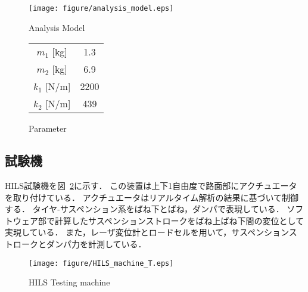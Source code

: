 \documentclass{article_vdlab_sotsuron_youshi}
\begin{document}
\begin{figure}[H]
  \begin{minipage}{0.5\hsize}
    \begin{center}
      \texttt{[image: figure/analysis\_model.eps]}
      \vspace*{1mm}
      \caption{Analysis Model}
    \label{fig:Analysis Model}
    \end{center}
  \end{minipage}
  \begin{minipage}{0.35\hsize}
      \begin{center}
	\makeatletter
	\def\@captype{table}
	\makeatother
	\caption{Parameter}
	\label{tab:parameter}
	  \begin{tabular}{cc}\hline
	    $m_1$ [kg] & 1.3\\
	    $m_2$ [kg] & 6.9\\
	    $k_1$ [N/m] & 2200\\
	    $k_2$ [N/m] & 439\\\hline
	  \end{tabular}
      \end{center}
  \end{minipage}
\end{figure}

\subsection{試験機}
HILS試験機を図~\ref{fig:testing_machine}に示す．
この装置は上下1自由度で路面部にアクチュエータを取り付けている．
アクチュエータはリアルタイム解析の結果に基づいて制御する．
タイヤ-サスペンション系をばね下とばね，ダンパで表現している．
ソフトウェア部で計算したサスペンションストロークをばね上ばね下間の変位として実現している．
また，レーザ変位計とロードセルを用いて，サスペンションストロークとダンパ力を計測している．

\vspace{5mm}
\begin{figure}[H]
 \centering
 \texttt{[image: figure/HILS\_machine\_T.eps]}
 \vspace{-2mm}
  \caption{HILS Testing machine}
 \label{fig:testing_machine}
\end{figure}

\end{document}
